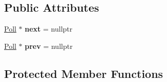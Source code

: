 \subsection*{Public Attributes}
\begin{DoxyCompactItemize}
\item 
\mbox{\label{structu_s_1_1_socket_aece79bbb7913c1ebb7a5fad75b35a315}} 
\mbox{\hyperlink{struct_poll}{Poll}} $\ast$ {\bfseries next} = nullptr
\item 
\mbox{\label{structu_s_1_1_socket_a954aacb6f92fd2d0eb7ad78c3e0dc913}} 
\mbox{\hyperlink{struct_poll}{Poll}} $\ast$ {\bfseries prev} = nullptr
\end{DoxyCompactItemize}
\subsection*{Protected Member Functions}
